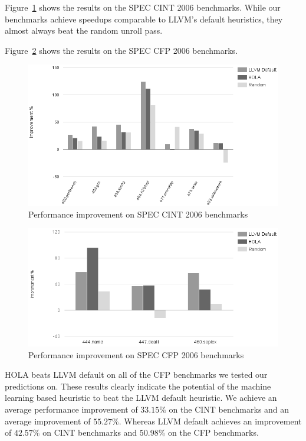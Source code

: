 \documentclass[]{sig-alternate}
\begin{document}
Figure~\ref{fig:cintResults} shows the results on the SPEC CINT 2006 benchmarks. 
While our benchmarks achieve speedups comparable to  LLVM's default heuristics, they almost always beat the random unroll pass.  

Figure~\ref{fig:cfpResults} shows the results on the SPEC CFP 2006 benchmarks. 
\begin{figure}
  \center
  \includegraphics[width=0.90\linewidth]{fig/cint.png}
  \caption{Performance improvement on SPEC CINT 2006 benchmarks}
  \label{fig:cintResults}
\end{figure}
\begin{figure}
  \center
  \includegraphics[width=0.90\linewidth]{fig/cfp.png}
  \caption{Performance improvement on SPEC CFP 2006 benchmarks}
  \label{fig:cfpResults}
\end{figure}

HOLA beats LLVM default on all of the CFP benchmarks we tested our predictions on. These results clearly indicate the potential of the machine learning based heuristic to beat the LLVM default heuristic. We achieve an average performance improvement of $33.15 \%$  on the CINT benchmarks and an average improvement of $55.27 \%$. Whereas LLVM default achieves an improvement of $42.57 \%$ on CINT benchmarks and $50.98 \%$ on the CFP benchmarks. 
\end{document}
